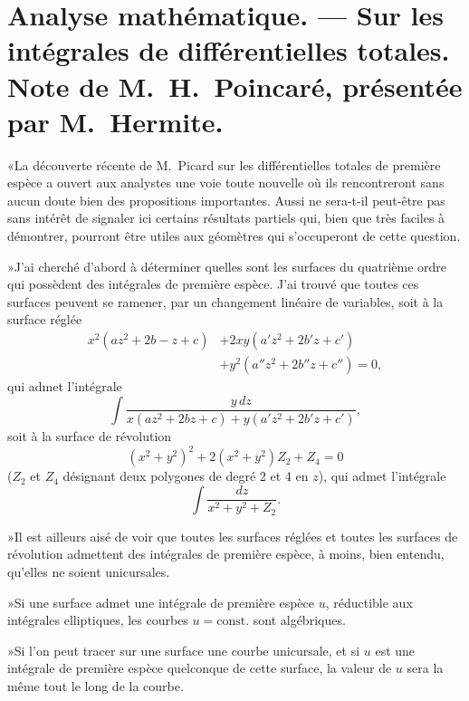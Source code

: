 \documentclass{article}
\begin{document}
\section*{Analyse mathématique. --- Sur les intégrales de différentielles totales. Note de M.~H.~Poincaré, présentée par M.~Hermite.}

«La découverte récente de M.~Picard sur les différentielles totales de première espèce a ouvert aux analystes une voie toute nouvelle où ils rencontreront sans aucun doute bien des propositions importantes. Aussi ne sera-t-il peut-être pas sans intérêt de signaler ici certains résultats partiels qui, bien que très faciles à démontrer, pourront être utiles aux géomètres qui s'occuperont de cette question.

»J'ai cherché d'abord à déterminer quelles sont les surfaces du quatrième ordre qui possèdent des intégrales de première espèce. J'ai trouvé que toutes ces surfaces peuvent se ramener, par un changement linéaire de variables, soit à la surface réglée
\[
\begin{aligned}
x^{2}(az^{2} + 2b - z + c) &+ 2xy(a'z^{2} + 2b'z + c') \\
&+ y^{2}(a''z^{2} + 2b''z + c'') = 0,
\end{aligned}
\]
qui admet l'intégrale
\[
\int \frac{y\,dz}{x(az^{2} + 2bz + c) + y(a'z^{2} + 2b'z + c')},
\]
soit à la surface de révolution
\[
(x^{2} + y^{2})^{2} + 2(x^{2} + y^{2})Z_{2} + Z_{4} = 0
\]
($Z_{2}$ et $Z_{4}$ désignant deux polygones de degré 2 et 4 en $z$), qui admet l'intégrale
\[
\int \frac{dz}{x^{2} + y^{2} + Z_{2}}.
\]

»Il est ailleurs aisé de voir que toutes les surfaces réglées et toutes les surfaces de révolution admettent des intégrales de première espèce, à moins, bien entendu, qu'elles ne soient unicursales.

»Si une surface admet une intégrale de première espèce $u$, réductible aux intégrales elliptiques, les courbes $u = \text{const.}$ sont algébriques.

»Si l'on peut tracer sur une surface une courbe unicursale, et si $u$ est une intégrale de première espèce quelconque de cette surface, la valeur de $u$ sera la même tout le long de la courbe.
\end{document}
